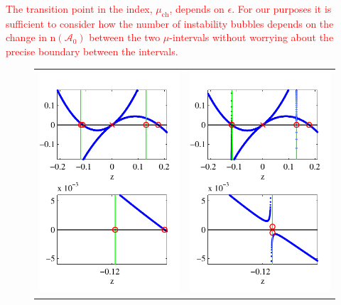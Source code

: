\documentclass[review,onefignum,onetabnum]{siamart171218}
\newcommand{\rmn}{\mathrm{n}}
\newcommand{\calA}{\mathcal{A}}
\newcommand{\revised}[1]{ \textcolor{red}{#1} }
\begin{document}
\revised{
\begin{remark}
The transition point in the index, $\mu_{\mathrm{ch}}$, depends on $\epsilon$. For our purposes it is sufficient to consider how the number of instability bubbles depends on the change in $\rmn(\calA_0)$ between the two $\mu$-intervals without worrying about the precise boundary between the intervals.
\end{remark}
}

\begin{figure}[ht]%
\begin{center}
\begin{tabular}{cc}
\includegraphics{KreinEvalK000Mu36} &
\includegraphics{KreinEvalK005Mu36}

\end{tabular}
\end{center}
\end{figure}
\end{document}
